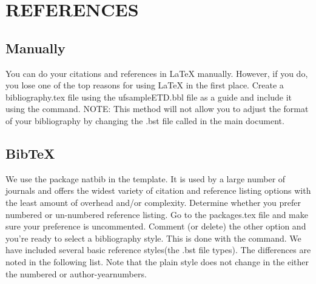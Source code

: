 \chapter{REFERENCES}
\section{Manually}
You can do your citations and references in LaTeX manually. However, if you do, you lose one of the top reasons for using LaTeX in the first place. Create a bibliography.tex file using the ufsampleETD.bbl file as a guide and include it using the \verb== command. NOTE: This method will not allow you to adjust the format of your bibliography by changing the .bst file called in the main document.
\section{BibTeX}
We use the package natbib in the template. \citep{Dill93} It is used by a large number of journals and offers the widest variety of citation and reference listing options with the least amount of overhead and/or complexity. Determine whether you prefer numbered or un-numbered reference listing. Go to the packages.tex file and make sure your preference is uncommented. Comment (or delete) the other option and you're ready to select a bibliography style.\citep{Adams89} This is done with the \verb== command. We have included several basic reference styles(the .bst file types). The differences are noted in the following list. Note that the plain style does not change in the either the numbered or author-yearnumbers. \citep{andr:2000}

